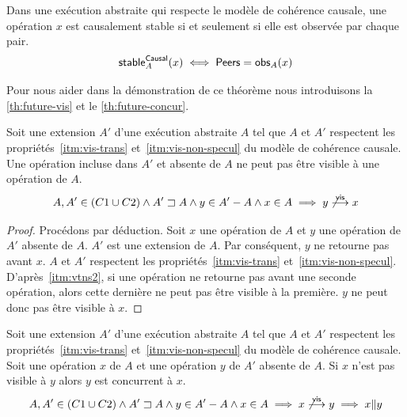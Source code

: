 \begin{theorem}\label{th:cs}
Dans une exécution abstraite qui respecte le modèle de cohérence causale, une opération $x$ est causalement stable si et seulement si elle est observée par chaque pair.
\begin{equation*}
    \operatorname{\mathsf{stable}}_A^{\operatorname{\mathsf{Causal}}}(x) \iff \operatorname{\mathsf{Peers}} = \operatorname{\mathsf{obs}}_A(x)
\end{equation*}
\end{theorem}

Pour nous aider dans la démonstration de ce théorème nous introduisons la \autoref{th:future-vis} et le \autoref{th:future-concur}.

\begin{proposition}\label{th:future-vis}
Soit une extension $A'$ d'une exécution abstraite $A$ tel que $A$ et $A'$ respectent les propriétés~\ref{itm:vis-trans} et~\ref{itm:vis-non-specul} du modèle de cohérence causale.
Une opération incluse dans $A'$ et absente de $A$ ne peut pas être visible à une opération de $A$.
\begin{equation*}
    A, A' \in (C1 \cup C2) \land A' \sqsupset A \land y \in A'- A \land x \in A \implies y \not\overset{\mathsf{vis}}{\longrightarrow} x
\end{equation*}
\end{proposition}

\begin{proof}
Procédons par déduction.
Soit $x$ une opération de $A$ et $y$ une opération de $A'$ absente de $A$.
$A'$ est une extension de $A$.
Par conséquent, $y$ ne retourne pas avant $x$.
$A$ et $A'$ respectent les propriétés~\ref{itm:vis-trans} et~\ref{itm:vis-non-specul}.
D'après~\ref{itm:vtns2}, si une opération ne retourne pas avant une seconde opération, alors cette dernière ne peut pas être visible à la première.
$y$ ne peut donc pas être visible à $x$.
\end{proof}

\begin{corollary}\label{th:future-concur}
Soit une extension $A'$ d'une exécution abstraite $A$ tel que $A$ et $A'$ respectent les propriétés~\ref{itm:vis-trans} et~\ref{itm:vis-non-specul} du modèle de cohérence causale.
Soit une opération $x$ de $A$ et une opération $y$ de $A'$ absente de $A$.
Si $x$ n'est pas visible à $y$ alors $y$ est concurrent à $x$.
\begin{equation*}
    A, A' \in (C1 \cup C2) \land A' \sqsupset A \land y \in A'- A \land x \in A \implies x \not\overset{\mathsf{vis}}{\longrightarrow} y \implies x \| y
\end{equation*}
\end{corollary}

